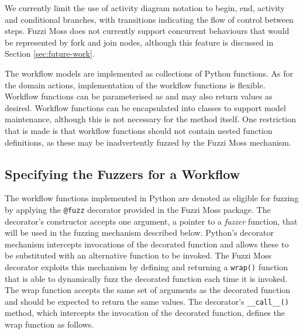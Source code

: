 \documentclass{sig-alternate}
\begin{document}
We currently limit the use of activity diagram notation to begin, end, activity
and conditional branches, with transitions indicating the flow of control
between steps.  Fuzzi Moss does not currently support concurrent behaviours that
would be represented by fork and join nodes, although this feature is discussed
in Section \ref{sec:future-work}.


The workflow models are implemented as collections of Python functions.  As for
the domain actions, implementation of the workflow functions is
flexible. Workflow functions can be parameterised as and may also return values
as desired.  Workflow functions can be encapsulated into classes to support
model maintenance, although this is not necessary for the method itself.  One
restriction that is made is that workflow functions should not contain nested
function definitions, as these may be inadvertently fuzzed by the Fuzzi Moss
mechanism.


\subsection{Specifying the Fuzzers for a Workflow}


The workflow functions implemented in Python are denoted as eligible for fuzzing
by applying the \lstinline!@fuzz! decorator provided in the Fuzzi Moss
package. The decorator's constructor accepts one argument, a pointer to a
\emph{fuzzer} function, that will be used in the fuzzing mechanism described
below.  Python's decorator mechanism intercepts invocations of the decorated
function and allows these to be substituted with an alternative function to be
invoked.  The Fuzzi Moss decorator exploits this mechanism by defining and
returning a \lstinline!wrap()!  function that is able to dynamically fuzz the
decorated function each time it is invoked.  The wrap function accepts the same
set of arguments as the decorated function and should be expected to return the
same values. The decorator's \lstinline!__call__()!  method, which intercepts
the invocation of the decorated function, defines the wrap function as follows.
\end{document}
